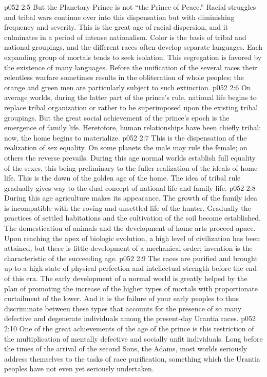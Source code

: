 \vs p052 2:5 \pc But the Planetary Prince is not “the Prince of Peace.” Racial struggles and tribal wars continue over into this dispensation but with diminishing frequency and severity. This is the great age of racial dispersion, and it culminates in a period of intense nationalism. Color is the basis of tribal and national groupings, and the different races often develop separate languages. Each expanding group of mortals tends to seek isolation. This segregation is favored by the existence of many languages. Before the unification of the several races their relentless warfare sometimes results in the obliteration of whole peoples; the orange and green men are particularly subject to such extinction.
\vs p052 2:6 On average worlds, during the latter part of the prince’s rule, national life begins to replace tribal organization or rather to be superimposed upon the existing tribal groupings. But the great social achievement of the prince’s epoch is the emergence of family life. Heretofore, human relationships have been chiefly tribal; now, the home begins to materialize.
\vs p052 2:7 This is the dispensation of the realization of sex equality. On some planets the male may rule the female; on others the reverse prevails. During this age normal worlds establish full equality of the sexes, this being preliminary to the fuller realization of the ideals of home life. This is the dawn of the golden age of the home. The idea of tribal rule gradually gives way to the dual concept of national life and family life.
\vs p052 2:8 During this age agriculture makes its appearance. The growth of the family idea is incompatible with the roving and unsettled life of the hunter. Gradually the practices of settled habitations and the cultivation of the soil become established. The domestication of animals and the development of home arts proceed apace. Upon reaching the apex of biologic evolution, a high level of civilization has been attained, but there is little development of a mechanical order; invention is the characteristic of the succeeding age.
\vs p052 2:9 \pc The races are purified and brought up to a high state of physical perfection and intellectual strength before the end of this era. The early development of a normal world is greatly helped by the plan of promoting the increase of the higher types of mortals with proportionate curtailment of the lower. And it is the failure of your early peoples to thus discriminate between these types that accounts for the presence of so many defective and degenerate individuals among the present\hyp{}day Urantia races.
\vs p052 2:10 One of the great achievements of the age of the prince is this restriction of the multiplication of mentally defective and socially unfit individuals. Long before the times of the arrival of the second Sons, the Adams, most worlds seriously address themselves to the tasks of race purification, something which the Urantia peoples have not even yet seriously undertaken.
